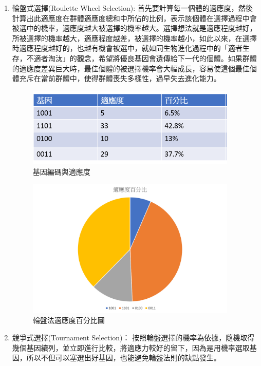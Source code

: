 \begin{enumerate}
	\item
	      輪盤式選擇(Roulette Wheel Selection):
	      首先要計算每一個體的適應度，然後計算出此適應度在群體適應度總和中所佔的比例，表示該個體在選擇過程中會被選中的機率，適應度越大被選擇的機率越大。選擇想法就是適應程度越好，所被選擇的機率越大，適應程度越差，被選擇的機率越小，如此以來，在選擇時適應程度越好的，也越有機會被選中，就如同生物進化過程中的「適者生存，不適者淘汰」的觀念，希望將優良基因會遺傳給下一代的個體。如果群體的適應度差異巨大時，最佳個體的被選擇機率會大幅成長，容易使這個最佳個體充斥在當前群體中，使得群體喪失多樣性，過早失去進化能力。
	      \begin{figure}[H]
		      \centerline{\includegraphics[width=10cm]{pic/Wheel.PNG}}
		      \caption{基因編碼與適應度}
		      \label{fig:GeneEncodeAndFitness}
	      \end{figure}
	      \begin{figure}[H]
		      \centerline{\includegraphics[width=10cm]{pic/wheelFitness.png}}
		      \caption{輪盤法適應度百分比圖}
		      \label{fig:WheelMethodPercentage}
	      \end{figure}
	      

	\item
	      競爭式選擇(Tournament Selection)：
	      按照輪盤選擇的機率為依據，隨機取得幾個基因續列，並立即進行比較，將適應力較好的留下，因為是用機率選取基因，所以不但可以塞選出好基因，也能避免輪盤法則的缺點發生。
\end{enumerate}

